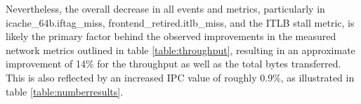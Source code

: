 Nevertheless, the overall decrease in all events and metrics, particularly in icache\_64b.iftag\_miss, frontend\_retired.itlb\_miss, and the ITLB stall metric, is likely the primary factor behind the observed improvements in the measured network metrics outlined in table \ref{table:throughput}, resulting in an approximate improvement of 14\% for the throughput as well as the total bytes transferred. This is also reflected by an increased IPC value of roughly 0.9\%, as illustrated in table \ref{table:numberresults}.
